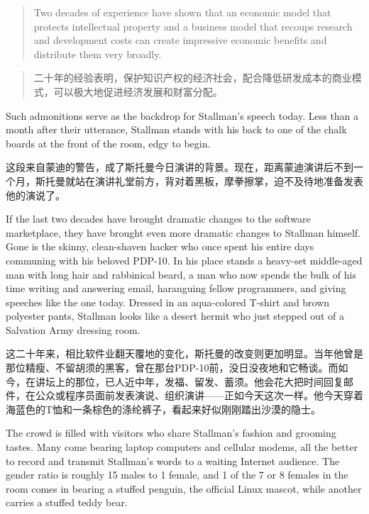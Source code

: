 \ifdefined\eng
\begin{quote}
Two decades of experience have shown that an economic model that protects intellectual property and a business model that recoups research and development costs can create impressive economic benefits and distribute them very broadly.
\end{quote}
\fi

\ifdefined\chs
\begin{quote}
二十年的经验表明，保护知识产权的经济社会，配合降低研发成本的商业模式，可以极大地促进经济发展和财富分配。
\end{quote}

\fi

\ifdefined\eng
Such admonitions serve as the backdrop for Stallman's speech today. Less than a month after their utterance, Stallman stands with his back to one of the chalk boards at the front of the room, edgy to begin.
\fi

\ifdefined\chs
这段来自蒙迪的警告，成了斯托曼今日演讲的背景。现在，距离蒙迪演讲后不到一个月，斯托曼就站在演讲礼堂前方，背对着黑板，摩拳擦掌，迫不及待地准备发表他的演说了。
\fi

\ifdefined\eng
If the last two decades have brought dramatic changes to the software marketplace, they have brought even more dramatic changes to Stallman himself. Gone is the skinny, clean-shaven hacker who once spent his entire days communing with his beloved PDP-10. In his place stands a heavy-set middle-aged man with long hair and rabbinical beard, a man who now spends the bulk of his time writing and answering email, haranguing fellow programmers, and giving speeches like the one today. Dressed in an aqua-colored T-shirt and brown polyester pants, Stallman looks like a desert hermit who just stepped out of a Salvation Army dressing room.
\fi

\ifdefined\chs
这二十年来，相比软件业翻天覆地的变化，斯托曼的改变则更加明显。当年他曾是那位精瘦、不留胡须的黑客，曾在那台PDP-10前，没日没夜地和它畅谈。而如今，在讲坛上的那位，已人近中年，发福、留发、蓄须。他会花大把时间回复邮件，在公众或程序员面前发表演说、组织演讲——正如今天这次一样。他今天穿着海蓝色的T恤和一条棕色的涤纶裤子，看起来好似刚刚踏出沙漠的隐士。
\fi

\ifdefined\eng
The crowd is filled with visitors who share Stallman's fashion and grooming tastes. Many come bearing laptop computers and cellular modems, all the better to record and transmit Stallman's words to a waiting Internet audience. The gender ratio is roughly 15 males to 1 female, and 1 of the 7 or 8 females in the room comes in bearing a stuffed penguin, the official Linux mascot, while another carries a stuffed teddy bear.
\fi

